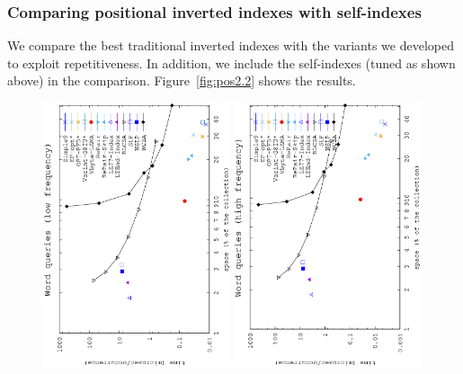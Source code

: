 \documentclass[review]{elsarticle}
\begin{document}
\subsubsection{Comparing positional inverted indexes with self-indexes} \label{exp:pos:ours}

We compare the best traditional inverted indexes with the variants we developed to exploit repetitiveness. In addition,
we include the self-indexes (tuned as shown above) in the comparison. Figure~\ref{fig:pos2.2} shows the results.

\begin{figure}[t]
\begin{center}
\includegraphics[angle=-90,width=0.49\textwidth]{../figures/f4/words1-1000/locate-words1-1000.eps}
\includegraphics[angle=-90,width=0.49\textwidth]{../figures/f4/words1001-100k/locate-words1001-100k.eps}

\end{center}
\end{figure}
\end{document}
